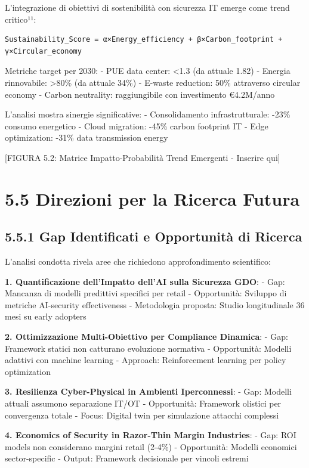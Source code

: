 \documentclass[12pt,a4paper,oneside]{book}
\numberwithin{figure}{chapter} %
\numberwithin{table}{chapter}  %
\begin{document}
L'integrazione di obiettivi di sostenibilità con sicurezza IT emerge
come trend critico¹¹:

\begin{verbatim}
Sustainability_Score = α×Energy_efficiency + β×Carbon_footprint + γ×Circular_economy
\end{verbatim}

Metriche target per 2030: - PUE data center: \textless1.3 (da attuale
1.82) - Energia rinnovabile: \textgreater80\% (da attuale 34\%) -
E-waste reduction: 50\% attraverso circular economy - Carbon neutrality:
raggiungibile con investimento €4.2M/anno

L'analisi mostra sinergie significative: - Consolidamento
infrastrutturale: -23\% consumo energetico - Cloud migration: -45\%
carbon footprint IT - Edge optimization: -31\% data transmission energy

{[}FIGURA 5.2: Matrice Impatto-Probabilità Trend Emergenti - Inserire
qui{]}

\section{5.5 Direzioni per la Ricerca
Futura}\label{direzioni-per-la-ricerca-futura}

\subsection{5.5.1 Gap Identificati e Opportunità di
Ricerca}\label{gap-identificati-e-opportunituxe0-di-ricerca}

L'analisi condotta rivela aree che richiedono approfondimento
scientifico:

\textbf{1. Quantificazione dell'Impatto dell'AI sulla Sicurezza GDO}: -
Gap: Mancanza di modelli predittivi specifici per retail - Opportunità:
Sviluppo di metriche AI-security effectiveness - Metodologia proposta:
Studio longitudinale 36 mesi su early adopters

\textbf{2. Ottimizzazione Multi-Obiettivo per Compliance Dinamica}: -
Gap: Framework statici non catturano evoluzione normativa - Opportunità:
Modelli adattivi con machine learning - Approach: Reinforcement learning
per policy optimization

\textbf{3. Resilienza Cyber-Physical in Ambienti Iperconnessi}: - Gap:
Modelli attuali assumono separazione IT/OT - Opportunità: Framework
olistici per convergenza totale - Focus: Digital twin per simulazione
attacchi complessi

\textbf{4. Economics of Security in Razor-Thin Margin Industries}: -
Gap: ROI models non considerano margini retail (2-4\%) - Opportunità:
Modelli economici sector-specific - Output: Framework decisionale per
vincoli estremi
\end{document}
